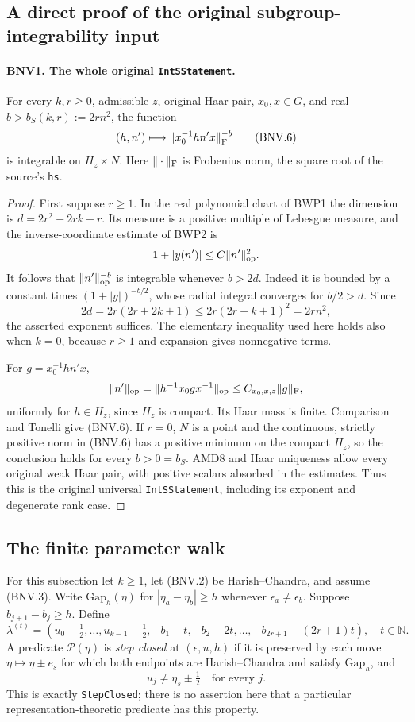 \subsection{A direct proof of the original subgroup-integrability input}

\paragraph{BNV1. The whole original \texttt{IntSStatement}.}
\label{claim:BNV1}
For every $k,r\ge0$, admissible $z$, original Haar pair, $x_0,x\in G$, and
real $b> b_S(k,r):=2rn^2$, the function
\[
 (h,n')\longmapsto \|x_0^{-1}hn'x\|_{\rm F}^{-b}
 \tag{BNV.6}
\]
is integrable on $H_z\times N$.  Here $\|\cdot\|_{\rm F}$ is Frobenius
norm, the square root of the source's \texttt{hs}.

\begin{proof}
First suppose $r\ge1$.  In the real polynomial chart of BWP1 the dimension
is $d=2r^2+2rk+r$.  Its measure is a positive multiple of Lebesgue measure,
and the inverse-coordinate estimate of BWP2 is
\[
 1+|y(n')|\le C\|n'\|_{\rm op}^2.
\]
It follows that $\|n'\|_{\rm op}^{-b}$ is integrable whenever $b>2d$.
Indeed it is bounded by a constant times $(1+|y|)^{-b/2}$, whose radial
integral converges for $b/2>d$.  Since
\[
 2d=2r(2r+2k+1)\le2r(2r+k+1)^2=2rn^2,
\]
the asserted exponent suffices.  The elementary inequality used here holds
also when $k=0$, because $r\ge1$ and expansion gives nonnegative terms.

For $g=x_0^{-1}hn'x$,
\[
 \|n'\|_{\rm op}
 =\|h^{-1}x_0gx^{-1}\|_{\rm op}
 \le C_{x_0,x,z}\|g\|_{\rm F},
\]
uniformly for $h\in H_z$, since $H_z$ is compact.  Its Haar mass is finite.
Comparison and Tonelli give (BNV.6).  If $r=0$, $N$ is a point and the
continuous, strictly positive norm in (BNV.6) has a positive minimum on the
compact $H_z$, so the conclusion holds for every $b>0=b_S$.
AMD8 and Haar uniqueness allow every original weak Haar pair, with positive
scalars absorbed in the estimates.  Thus this is the original universal
\texttt{IntSStatement}, including its exponent and degenerate rank case.
\end{proof}

\subsection{The finite parameter walk}

For this subsection let $k\ge1$, let (BNV.2) be Harish--Chandra, and assume
(BNV.3).  Write $\mathrm{Gap}_h(\eta)$ for
$|\eta_a-\eta_b|\ge h$ whenever $\epsilon_a\ne\epsilon_b$.
Suppose $b_{j+1}-b_j\ge h$.  Define
\[
 \lambda^{(t)}=
 (u_0-\tfrac12,\ldots,u_{k-1}-\tfrac12,
       -b_1-t,-b_2-2t,\ldots,-b_{2r+1}-(2r+1)t),\quad t\in\mathbb N.
 \tag{BNV.7}
\]
A predicate $\mathcal P(\eta)$ is \emph{step closed} at $(\epsilon,u,h)$ if
it is preserved by each move $\eta\mapsto\eta\pm e_s$ for which both
endpoints are Harish--Chandra and satisfy $\mathrm{Gap}_h$, and
\[
 u_j\ne\eta_s\pm\tfrac12\quad\text{for every }j.
 \tag{BNV.8}
\]
This is exactly \texttt{StepClosed}; there is no assertion here that a
particular representation-theoretic predicate has this property.


